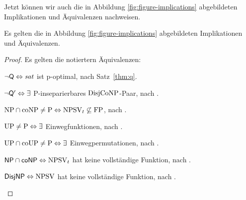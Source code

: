 Jetzt können wir auch die in Abbildung \ref{fig:figure-implications} abgebildeten Implikationen und Äquivalenzen nachweisen.
\begin{theorem}\label{thm:figure-implications}
    Es gelten die in Abbildung \ref{fig:figure-implications} abgebildeten Implikationen und Äquivalenzen.
\end{theorem}
\begin{proof}
    Es gelten die notiertern Äquivalenzen:
    \begin{Prooflist}[nosep]
    \item $\neg\mathsf{Q} \Leftrightarrow \mathit{sat}$ ist p-optimal, nach Satz~\ref{thm:q}.
    \item $\neg\mathsf{Q}' \Leftrightarrow\exists$ P-inseparierbares $\mathrm{DisjCoNP}$-Paar, nach \textcite{fortnow_separability_2002}.
    \item $\mathrm{NP}\cap\mathrm{coNP}\neq\mathrm{P} \Leftrightarrow \mathrm{NPSV}_t\not\subseteq\mathrm{FP}$, nach \textcite{selman_taxonomy_1994}.
    \item $\mathrm{UP}\neq\mathrm{P} \Leftrightarrow\exists$ Einwegfunktionen, nach \textcite[Thm.~10]{grollmann_complexity_1988}.
    \item $\mathrm{UP}\cap\mathrm{coUP}\neq\mathrm{P} \Leftrightarrow\exists$ Einwegpermutationen, nach \textcite{homan_one-way_2003}.
    \item $\mathsf{NP}{}\cap{}\mathsf{coNP} \Leftrightarrow \mathrm{NPSV}_t$ hat keine vollständige Funktion, nach \textcite[Prop.~3]{beyersdorff_nondeterministic_2009}.
    \item $\mathsf{DisjNP} \Leftrightarrow \mathrm{NPSV}$ hat keine vollständige Funktion, nach \textcite[Thm.~9]{glaser_reductions_2005}.
    \end{Prooflist}


\end{proof}
